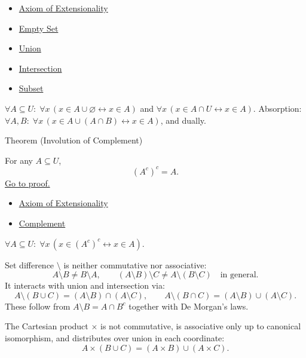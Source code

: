 \begin{dependencies}
\begin{itemize}
  \item \hyperref[ax:extensionality]{Axiom of Extensionality}
  \item \hyperref[def:empty-set]{Empty Set}
  \item \hyperref[def:union]{Union}
  \item \hyperref[def:intersection]{Intersection}
  \item \hyperref[def:subset]{Subset}
\end{itemize}
\end{dependencies}

\begin{remark*}
$\forall A \subseteq U:\; \forall x\,(x \in A \cup \varnothing \leftrightarrow x \in A)$ and $\forall x\,(x \in A \cap U \leftrightarrow x \in A)$.
Absorption: $\forall A, B:\; \forall x\,(x \in A \cup (A \cap B) \leftrightarrow x \in A)$, and dually.
\end{remark*}

\begin{theorembox}{Theorem (Involution of Complement)}
\begin{theorem}\label{thm:involution}
For any $A \subseteq U$,
\[
(A^c)^c = A.
\]
\hyperref[prf:involution]{Go to proof.}
\end{theorem}
\end{theorembox}

\begin{dependencies}
\begin{itemize}
  \item \hyperref[ax:extensionality]{Axiom of Extensionality}
  \item \hyperref[def:complement]{Complement}
\end{itemize}
\end{dependencies}

\begin{remark*}
$\forall A \subseteq U:\; \forall x\,(x \in (A^c)^c \leftrightarrow x \in A)$.
\end{remark*}

\begin{remark*}
Set difference $\setminus$ is neither commutative nor associative:
\[
A \setminus B \neq B \setminus A,
\qquad
(A \setminus B) \setminus C \neq A \setminus (B \setminus C) \quad \text{in general}.
\]
It interacts with union and intersection via:
\[
A \setminus (B \cup C) = (A \setminus B) \cap (A \setminus C),
\qquad
A \setminus (B \cap C) = (A \setminus B) \cup (A \setminus C).
\]
These follow from $A \setminus B = A \cap B^c$ together with De Morgan's laws.
\end{remark*}

\begin{remark*}
The Cartesian product $\times$ is not commutative, is associative only up to
canonical isomorphism, and distributes over union in each coordinate:
\[
A \times (B \cup C) = (A \times B) \cup (A \times C).
\]
\end{remark*}
